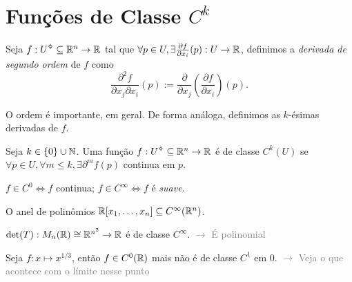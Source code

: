\section{Funções de Classe \(C^k\)}
 
\begin{definition}
    Seja \(f: U\ab\subseteq \R^n \to \R\) tal que \(\forall p \in U, \exists \frac{\partial f }{\partial x_i}(p): U \to \mathbb{R}\), definimos a \emph{derivada de segundo ordem} de \(f\) como 
    \[\frac{\partial^2 f}{\partial x_j \partial x_i}(p) := \frac{\partial}{\partial x_j}\left(\frac{\partial f}{\partial x_i}\right)(p).\]
\end{definition}
\begin{note}
    O ordem é importante, em geral. De forma análoga, definimos as $k$-ésimas derivadas  de \(f\).
\end{note}

\begin{definition}
    Seja \(k\in \{0\}\cup \mathbb{N} \). Uma função \(f:U\ab\subseteq \R^n\to \R\) é de classe \(C^k(U)\) se \(\forall p \in U, \forall m \leq k, \exists \partial^m f(p)\) continua em \(p\). 
\end{definition}

\begin{note}
\(f \in C^0\Leftrightarrow f\) continua; \(f \in C^\infty \Leftrightarrow f\) é \emph{suave}.  
\end{note}
\begin{example}
    O anel de polinômios \(\mathbb{R}[x_1,\ldots,x_n]\subseteq C^\infty(\mathbb{R}^n)\). 
\end{example}
\begin{example}
    \(\det(T): M_{n}(\mathbb{R}) \cong \mathbb{R}^{n^2}\to \mathbb{R}\) é de classe \(C^\infty\). \textcolor{gray}{\(\rightarrow\) É polinomial}
\end{example}
\begin{example}
    Seja \(f: x\mapsto x^{1/3}\), então \(f \in C^0(\mathbb{R})\) mais não é de classe \(C^1\) em \(0\). \textcolor{gray}{\(\rightarrow\) Veja o que acontece com o límite nesse punto}
\end{example}

